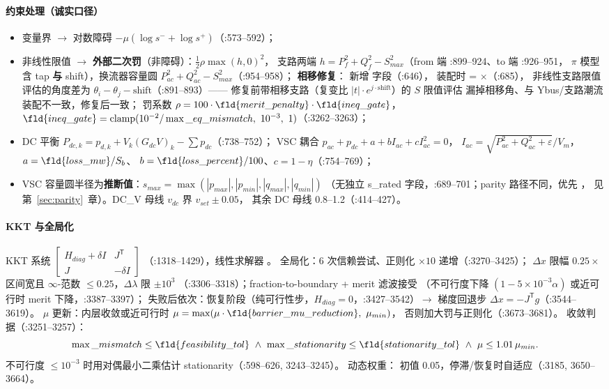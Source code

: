 \paragraph{约束处理（诚实口径）}
\begin{itemize}
  \item 变量界 $\to$ 对数障碍 $-\mu(\log s^-+\log s^+)$（:573--592）；
  \item 非线性限值 $\to$ \textbf{外部二次罚}（非障碍）：$\tfrac12\rho\max(h,0)^2$，
        支路两端 $h=P_f^2+Q_f^2-S_{max}^2$（from 端 :899--924、to 端 :926--951，
        $\pi$ 模型含 tap \textbf{与} shift），换流器容量圆 $P_{ac}^2+Q_{ac}^2-S_{max}^2$（:954--958）；
        \textbf{相移修复}： 新增  字段（:646），
        装配时  = $\times$（:685），
        非线性支路限值评估的角度差为 $\theta_i-\theta_j-\mathrm{shift}$（:891--893）——
        修复前带相移支路（复变比 $|t|\cdot e^{j\cdot\mathrm{shift}}$）的 $S$ 限值评估
        漏掉相移角、与 Ybus/支路潮流装配不一致，修复后一致；
        罚系数 $\rho=100\cdot\fld{merit\_penalty}\cdot\fld{ineq\_gate}$，
        $\fld{ineq\_gate}=\mathrm{clamp}(10^{-2}/\max\_eq\_mismatch,\ 10^{-3},\ 1)$（:3262--3263）；
  \item DC 平衡 $P_{dc,k}=p_{d,k}+V_k(G_{dc}V)_k-\sum p_{dc}$（:738--752）；
        VSC 耦合 $p_{ac}+p_{dc}+a+bI_{ac}+cI_{ac}^2=0$，
        $I_{ac}=\sqrt{P_{ac}^2+Q_{ac}^2+\varepsilon}/V_m$，$a=\fld{loss\_mw}/S_b$、
        $b=\fld{loss\_percent}/100$、$c=1-\eta$（:754--769）；
  \item VSC 容量圆半径为\textbf{推断值}：$s_{max}=\max(|p_{max}|,|p_{min}|,|q_{max}|,|q_{min}|)$
        （无独立 s\_rated 字段，:689--701；parity 路径不同，优先 ，
        见第~\ref{sec:parity}~章）。DC\_V 母线 $v_{dc}$ 界 $v_{set}\pm0.05$，
        其余 DC 母线 0.8--1.2（:414--427）。
\end{itemize}

\paragraph{KKT 与全局化}
KKT 系统 $\begin{bmatrix}H_{diag}+\delta I & J^{\mathsf T}\\ J & -\delta I\end{bmatrix}$
（:1318--1429），线性求解器 。
全局化：6 次信赖尝试、正则化 $\times10$ 递增（:3270--3425）；
$\Delta x$ 限幅 $0.25\times$ 区间宽且 $\infty$-范数 $\le0.25$，$\Delta\lambda$ 限 $\pm10^3$
（:3306--3318）；fraction-to-boundary + merit 滤波接受
（不可行度下降 $(1-5\times10^{-3}\alpha)$ 或近可行时 merit 下降，:3387--3397）；
失败后依次：恢复阶段（纯可行性步，$H_{diag}=0$，:3427--3542）$\to$
梯度回退步 $\Delta x=-J^{\mathsf T}g$（:3544--3619）。
$\mu$ 更新：内层收敛或近可行时 $\mu=\max(\mu\cdot\fld{barrier\_mu\_reduction},\ \mu_{min})$，
否则加大罚与正则化（:3673--3681）。
收敛判据（:3251--3257）：
\[
\max\_mismatch\le\fld{feasibility\_tol}\ \land\
\max\_stationarity\le\fld{stationarity\_tol}\ \land\ \mu\le1.01\,\mu_{min}.
\]
不可行度 $\le10^{-3}$ 时用对偶最小二乘估计 stationarity（:598--626, 3243--3245）。
动态权重：\fld{objective\_weight} 初值 0.05，停滞/恢复时自适应（:3185, 3650--3664）。

